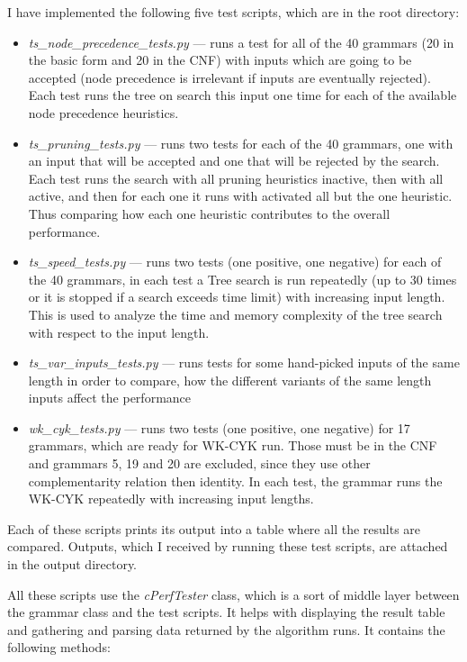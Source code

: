 I have implemented the following five test scripts, which are in the root directory:
\begin{itemize}
  \item{\textit{ts\_node\_precedence\_tests.py} --- runs a test for all of the 40 grammars (20 in the basic form and 20 in the CNF) with inputs which are going to be accepted (node precedence is irrelevant if inputs are eventually rejected). Each test runs the tree on search this input one time for each of the available node precedence heuristics.}

  \item{\textit{ts\_pruning\_tests.py} --- runs two tests for each of the 40 grammars, one with an input that will be accepted and one that will be rejected by the search. Each test runs the search with all pruning heuristics inactive, then with all active, and then for each one it runs with activated all but the one heuristic. Thus comparing how each one heuristic contributes to the overall performance.}

  \item{\textit{ts\_speed\_tests.py} --- runs two tests (one positive, one negative) for each of the 40 grammars, in each test a Tree search is run repeatedly (up to 30 times or it is stopped if a search exceeds time limit) with increasing input length. This is used to analyze the time and memory complexity of the tree search with respect to the input length.}

  \item{\textit{ts\_var\_inputs\_tests.py} --- runs tests for some hand-picked inputs of the same length in order to compare, how the different variants of the same length inputs affect the performance}

  \item{\textit{wk\_cyk\_tests.py} --- runs two tests (one positive, one negative) for 17 grammars, which are ready for WK-CYK run. Those must be in the CNF and grammars 5, 19 and 20 are excluded, since they use other complementarity relation then identity. In each test, the grammar runs the WK-CYK repeatedly with increasing input lengths.}
\end{itemize}

Each of these scripts prints its output into a table where all the results are compared. Outputs, which I received by running these test scripts, are attached in the output directory.

All these scripts use the \textit{cPerfTester} class, which is a sort of middle layer between the grammar class and the test scripts. It helps with displaying the result table and gathering and parsing data returned by the algorithm runs.
It contains the following methods:

